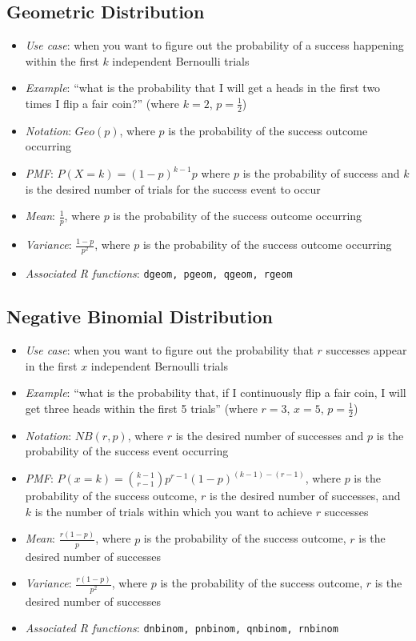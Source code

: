 \documentclass[12pt]{article}
\begin{document}
\subsection{Geometric Distribution}
\begin{itemize}
	\item \textit{Use case}: when you want to figure out the probability of a
	      success happening within the first $k$ independent Bernoulli trials
	\item \textit{Example}: ``what is the probability that I will get a heads
	      in the first two times I flip a fair coin?'' (where $k = 2$, $p = \frac{1}{2}$)
	\item \textit{Notation}: $Geo(p)$, where $p$ is the probability of the
	      success outcome occurring
	\item \textit{PMF}: $P(X = k) = (1-p)^{k-1}p$ where $p$ is the
	      probability of success and $k$ is the desired number of trials for the success event to occur
	\item \textit{Mean}: $\frac{1}{p}$, where $p$ is the probability of the success outcome occurring
	\item \textit{Variance}: $\frac{1-p}{p^2}$, where $p$ is the probability of the success outcome occurring
	\item \textit{Associated R functions}: \verb|dgeom, pgeom, qgeom, rgeom|
\end{itemize}
\subsection{Negative Binomial Distribution}
\begin{itemize}
	\item \textit{Use case}: when you want to figure out the probability that
	      $r$ successes appear in the first $x$ independent Bernoulli trials
	\item \textit{Example}: ``what is the probability that, if I continuously
	      flip a fair coin, I will get three heads within the first 5 trials'' (where
	      $r = 3$, $x = 5$, $p = \frac{1}{2}$)
	\item \textit{Notation}: $NB(r,p)$, where $r$ is the
	      desired number of successes and $p$ is the
	      probability of the success event occurring
	\item \textit{PMF}: $P(x = k) = {k-1\choose r-1} p^{r-1}(1-p)^{(k-1) - (r-1)}$, where $p$ is the
	      probability of the success outcome, $r$ is the desired number of
	      successes, and $k$ is the number of trials within which you want to
	      achieve $r$ successes
	\item \textit{Mean}: $\frac{r(1-p)}{p}$, where $p$ is the probability of
	      the success outcome, $r$ is the desired number of successes
	\item \textit{Variance}: $\frac{r(1-p)}{p^2}$, where $p$ is the probability of
	      the success outcome, $r$ is the desired number of successes
	\item \textit{Associated R functions}: \verb|dnbinom, pnbinom, qnbinom, rnbinom|
\end{itemize}
\end{document}
